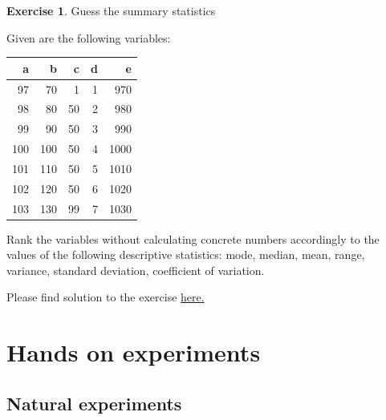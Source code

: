 \documentclass[
  12pt,
  oneside]{book}
\theoremstyle{definition}
\theoremstyle{definition}
\theoremstyle{definition}
\newtheorem{exercise}{Exercise}[chapter]
\theoremstyle{definition}
\theoremstyle{remark}
\begin{document}
\begin{exercise}
\protect\hypertarget{exr:guessstat}{}\label{exr:guessstat}Guess the summary statistics

Given are the following variables:

\begin{longtable}[]{@{}rrrrr@{}}
\toprule()
a & b & c & d & e \\
\midrule()
\endhead
97 & 70 & 1 & 1 & 970 \\
98 & 80 & 50 & 2 & 980 \\
99 & 90 & 50 & 3 & 990 \\
100 & 100 & 50 & 4 & 1000 \\
101 & 110 & 50 & 5 & 1010 \\
102 & 120 & 50 & 6 & 1020 \\
103 & 130 & 99 & 7 & 1030 \\
\bottomrule()
\end{longtable}

Rank the variables without calculating concrete numbers accordingly to the values of the following descriptive statistics: mode, median, mean, range, variance, standard deviation, coefficient of variation.

Please find solution to the exercise \protect\hyperlink{sol:guessstat}{here.}
\end{exercise}

\hypertarget{hands-on-experiments}{%
\chapter{Hands on experiments}\label{hands-on-experiments}}

\hypertarget{natural-experiments}{%
\section{Natural experiments}\label{natural-experiments}}
\end{document}
